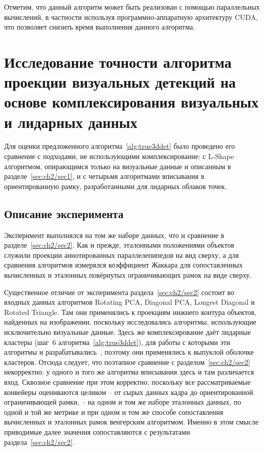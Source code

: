 Отметим, что данный алгоритм может быть реализован с помощью параллельных вычислений, в частности используя программно-аппаратную архитектуру CUDA, что позволяет снизить время выполнения данного алгоритма.

\section{Исследование точности алгоритма проекции визуальных детекций на основе комплексирования визуальных и лидарных данных}\label{sec:ch2/sec4}

Для оценки предложенного алгоритма~\ref{alg:true3ddet} было проведено его сравнение с подходами, не использующими комплексирование: с L-Shape алгоритмом, опирающимся только на визуальные данные и описанным в разделе~\cref{sec:ch2/sec1}, и с четырьмя алгоритмами вписывания в ориентированную рамку, разработанными для лидарных облаков точек.

\subsection{Описание эксперимента}

Эксперимент выполнялся на том же наборе данных, что и сравнение в разделе~\cref{sec:ch2/sec2}. Как и прежде, эталонными положениями объектов служили проекции аннотированных параллелепипедов на вид сверху, а для сравнения алгоритмов измерялся коэффициент Жаккара для сопоставленных вычисленных и эталонных повёрнутых ограничивающих рамок на виде сверху.

Существенное отличие от эксперимента раздела~\cref{sec:ch2/sec2} состоит во входных данных алгоритмов Rotating PCA, Diagonal PCA, Longest Diagonal и Rotated Triangle. Там они применялись к проекциям нижнего контура объектов, найденных на изображении, поскольку исследовались алгоритмы, использующие исключительно визуальные данные. Здесь же комплексирование даёт лидарные кластеры (шаг~6 алгоритма~\ref{alg:true3ddet}), для работы с которыми эти алгоритмы и разрабатывались~\cite{Wang2021}, поэтому они применялись к выпуклой оболочке кластеров. Отсюда следует, что поэтапное сравнение с разделом~\cref{sec:ch2/sec2} некорректно: у одного и того же алгоритма вписывания здесь и там различается вход. Сквозное сравнение при этом корректно, поскольку все рассматриваемые конвейеры оцениваются целиком -- от сырых данных кадра до ориентированной ограничивающей рамки, -- на одном и том же наборе эталонных данных, по одной и той же метрике и при одном и том же способе сопоставления вычисленных и эталонных рамок венгерским алгоритмом. Именно в этом смысле приводимые далее значения сопоставляются с результатами раздела~\cref{sec:ch2/sec2}.

